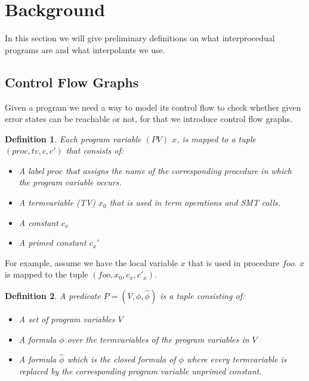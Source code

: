 \documentclass{article}
\newtheorem{mydef}{Definition}
\begin{document}
	\section{Background}
	In this section we will give preliminary definitions on what interprocedual programs are and what interpolants we use.
	
    
    \newcommand{\tf}{\ensuremath{\varphi}\xspace}
    \newcommand{\ctf}{\ensuremath{\widehat{\varphi}}\xspace}
    \newcommand{\invars}{\ensuremath{In}\xspace}
    \newcommand{\outvars}{\ensuremath{Out}\xspace}
    \newcommand{\auxvars}{\ensuremath{Aux}\xspace}
	
	\subsection{Control Flow Graphs}	
	Given a program we need a way to model its control flow to check whether given error states can be reachable or not, for that we introduce control flow graphs.
	
	\begin{mydef}
	Each program variable $(PV)$ $x$, is mapped to a tuple $(proc, tv, c, c')$ that consists of: 
		\begin{itemize}
			\item A label $proc$ that assigns the name of the corresponding procedure in which the program variable occurs. 
			\item A termvariable (TV) $x_0$ that is used in term operations and SMT calls.
			\item A constant $c_x$
			\item A primed constant $c_x'$
		\end{itemize}
	\end{mydef}
	For example, assume we have the local variable $x$ that is used in procedure $foo$. $x$ is mapped to the tuple $(foo, x_0, c_x, c'_x)$. 
	
	\begin{mydef}
		A predicate $P = (V, \phi, \widehat{\phi})$ is a tuple consisting of: 
		\begin{itemize}
			\item A set of program variables $V$
			\item A formula $\phi$ over the termvariables of the program variables in $V$
			\item A formula $\widehat{\phi}$ which is the closed formula of $\phi$ where every termvariable is replaced by the corresponding program variable unprimed constant.
		\end{itemize}
	\end{mydef}
	
\end{document}
